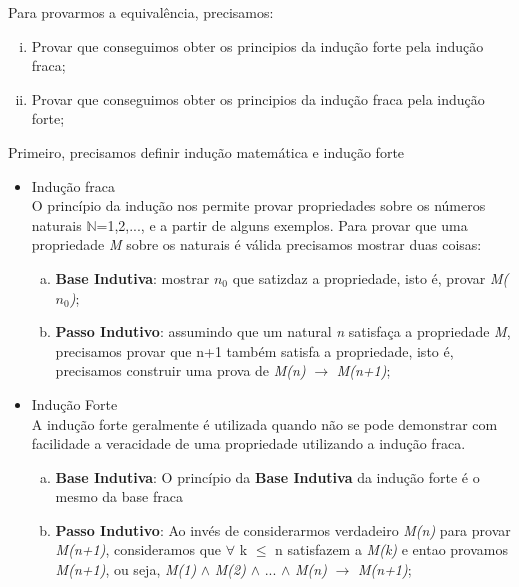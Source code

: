 \documentclass[a4paper, 10pt]{article}
\begin{document}
	Para provarmos a equivalência, precisamos:\vspace{5mm}
\begin{enumerate}[i)]
\item Provar que conseguimos obter os principios da indução forte pela indução fraca;
\item Provar que conseguimos obter os principios da indução fraca pela indução forte;
\end{enumerate}

\vspace{5mm}Primeiro, precisamos definir indução matemática e indução forte
\begin{itemize}
\item Indução fraca\\ 
	O princípio da indução nos permite provar propriedades sobre os números naturais $\mathbb{N}$={1,2,...}, e a partir de alguns exemplos.
    Para provar que uma propriedade \textit{M} sobre os naturais é válida precisamos mostrar duas coisas:
    
	\begin{enumerate} [a)]	
    \item \textbf{Base Indutiva}: mostrar \textit{$n_0$} que satizdaz a propriedade, isto é, provar \textit{M(\textit{$n_0$})};
    \item \textbf{Passo Indutivo}: assumindo que um natural \textit{n} satisfaça a propriedade \textit{M}, precisamos provar que n+1 também satisfa a propriedade, isto é, precisamos construir uma prova de \textit{M(n)} $\rightarrow$ \textit{ M(n+1)};
	\end{enumerate}
    
\item Indução Forte\\
	A indução forte geralmente é utilizada quando não se pode demonstrar com facilidade a veracidade de uma propriedade utilizando a indução fraca.    
    \begin{enumerate}[a)]
    \item \textbf{Base Indutiva}: O princípio da \textbf{Base Indutiva} da indução forte é o mesmo da base fraca
    \item \textbf{Passo Indutivo}: Ao invés de considerarmos verdadeiro \textit{M(n)} para provar \textit{ M(n+1)}, consideramos que $\forall$ k $\le$ n satisfazem a \textit{M(k)} e entao provamos \textit{M(n+1)}, ou seja, \textit{M(1)} $\wedge$ \textit{M(2)} $\wedge$ ... $\wedge$ \textit{M(n)} $\rightarrow$ \textit{ M(n+1)};
    \end{enumerate}
\end{itemize}
\end{document}

